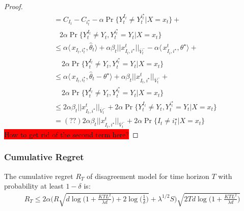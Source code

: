 \begin{proof}
\begin{align*}
&=C_{I_t} - C_{i^\star_t} - \alpha\Pr\{Y^{I_t}_t \neq Y^{i^\star_t}_t| X=x_t\} + \\
& \;\;\; 2\alpha\Pr\{Y_{t}^{I_t} \neq Y_t,Y^{ i^\star_t}_t =Y_t| X=x_t \}\\
& \le \alpha \langle\,x_{I_t,i^\star_t},\widehat{\theta}_t\rangle + \alpha \beta_t||x_{I_t, i^\star}^t||_{\overline{V}^-_t} -\alpha\langle\,x_{I_i,i^\star}^t, \theta^\star\rangle +\\
& \;\;\;\; 2\alpha\Pr\{Y_{t}^{I_t} \neq Y_t,Y^{ i^\star_t}_t =Y_t| X=x_t \}\\
& \le \alpha \langle\,x_{I_t,i^\star_t},\widehat{\theta}_t-\theta^\star\rangle + \alpha \beta_t||x_{I_t, i^\star}^t||_{\overline{V}^-_t} + \\
& \;\;\;\; 2\alpha\Pr\{Y_{t}^{I_t} \neq Y_t,Y^{ i^\star_t}_t =Y_t| X=x_t \}\\
& \le 2\alpha \beta_t||x_{I_t, i^\star}^t||_{\overline{V}^-_t} +  2\alpha\Pr\{Y_{t}^{I_t} \neq Y_t,Y^{ i^\star_t}_t =Y_t| X=x_t \}\\
& =(??) 2\alpha \beta_t||x_{I_t, i^\star}^t||_{\overline{V}^-_t} +  2\alpha\Pr\{I_t \neq  i^\star_t | X=x_t \}\
\end{align*}
	\colorbox{red}{
		How to get rid of the second term here?}
\end{proof}


\subsubsection{Cumulative Regret}
\label{sec:ra_cr}
\begin{thm}
	\label{thm:cr}
	The cumulative regret $R_T$ of disagreement model for time horizon $T$ with probability at least $1-\delta$ is:
	\begin{align*}
	R_T \le 2\alpha \bigg( R\sqrt{d\log\bigg(1 + \frac{KTL^2}{\lambda d}\bigg) + 2\log\bigg(\frac{1}{\delta}\bigg)} + \lambda^{1/2}S\bigg) \sqrt{2Td\log\bigg(1 + \frac{KTL^2}{\lambda d}\bigg)}
	\end{align*}
\end{thm}

